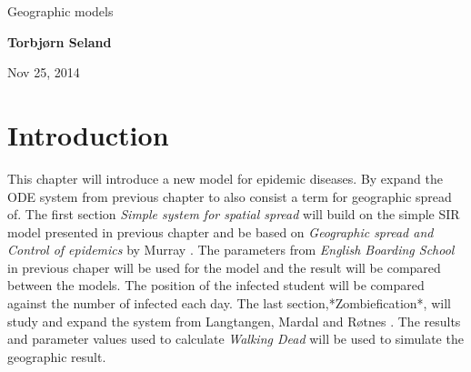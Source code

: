 \documentclass[%
twoside,                 %
final,                   %
10pt]{article}
\begin{document}




\thispagestyle{empty}

\begin{center}
{\LARGE\bf
\begin{spacing}{1.25}
Geographic models 
\end{spacing}
}
\end{center}


\begin{center}
{\bf Torbjørn Seland${}^{}$} \\ [0mm]
\end{center}

    \begin{center}
\end{center}


\begin{center}
Nov 25, 2014
\end{center}

\vspace{1cm}


\tableofcontents


\vspace{1cm} %




\section{Introduction}
This chapter will introduce a new model for epidemic diseases. By expand the ODE system from previous chapter to also consist a term for geographic spread of. The first section \emph{Simple system for spatial spread} will build on the simple SIR model presented in previous chapter and be based on \emph{Geographic spread and Control of epidemics} by Murray \cite{murray2003mathematical}. The parameters from \emph{English Boarding School} in previous chaper will be used for the model and the result will be compared between the models. The position of the infected student will be compared against the number of infected each day. The last section,*Zombiefication*, will study and expand the system from Langtangen, Mardal and Røtnes \cite{zombie-math}. The results and parameter values used to calculate \emph{Walking Dead} will be used to simulate the geographic result.
\end{document}
